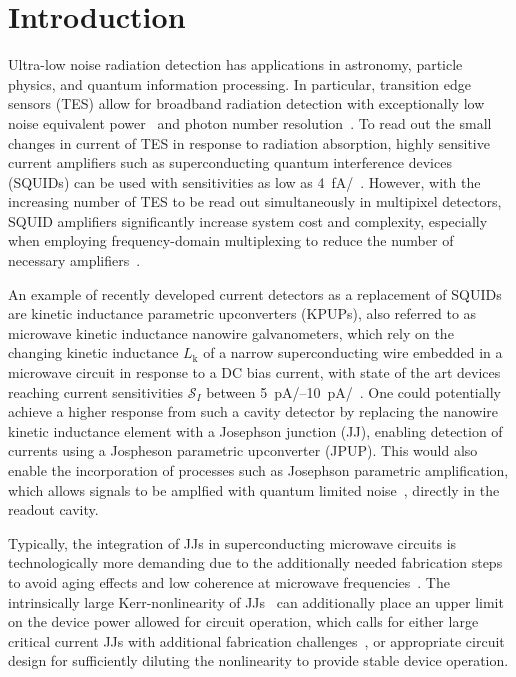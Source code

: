 \section{Introduction}

Ultra-low noise radiation detection has applications in astronomy, particle physics, and quantum information processing.
% 
In particular, transition edge sensors (TES) allow for broadband radiation detection with exceptionally low noise equivalent power~\cite{goldieUltralownoiseMoCuTransition2011} and photon number resolution~\cite{cabreraDetectionSingleInfrared1998,millerDemonstrationLownoiseNearinfrared2003}.
% 
To read out the small changes in current of TES in response to radiation absorption, highly sensitive current amplifiers such as superconducting quantum interference devices (SQUIDs) can be used with sensitivities as low as \SI{4}{\femto\ampere/\sqrthz}~\cite{gayUltralowNoiseCurrent2000}.
% 
However, with the increasing number of TES to be read out simultaneously in multipixel detectors, SQUID amplifiers significantly increase system cost and complexity, especially when employing frequency-domain multiplexing to reduce the number of necessary amplifiers~\cite{hendersonReadoutTwokilopixelTransitionedge2016}.

An example of recently developed current detectors as a replacement of SQUIDs are kinetic inductance parametric upconverters (KPUPs), also referred to as microwave kinetic inductance nanowire galvanometers, which rely on the changing kinetic inductance $L_\text{k}$ of a narrow superconducting wire embedded in a microwave circuit in response to a DC bias current, with state of the art devices reaching current sensitivities $\mathcal{S}_I$ between \SIrange{5}{10}{\pico\ampere/\sqrthz}~\cite{kherKineticInductanceParametric2016,doernerCompactMicrowaveKinetic2018,kuzminTerahertzTransitionEdgeSensor2018}.
%
One could potentially achieve a higher response from such a cavity detector by replacing the nanowire kinetic inductance element with a Josephson junction (JJ), enabling detection of currents using a Jospheson parametric upconverter (JPUP). 
% 
This would also enable the incorporation of processes such as Josephson parametric amplification, which allows signals to be amplfied with quantum limited noise~\cite{stehlikFastChargeSensing2015}, directly in the readout cavity.

Typically, the integration of JJs in superconducting microwave circuits is technologically more demanding due to the additionally needed fabrication steps to avoid aging effects and low coherence at microwave frequencies~\cite{pavolotskyAgingAnnealinginducedVariations2011,gotetiReliabilityStudiesNb2019,gunnarssonDielectricLossesMultilayer2013,yanaiObservationEnhancedCoherence2019}.
% 
The intrinsically large Kerr-nonlinearity of JJs~\cite{wallraffStrongCouplingSingle2004e} can additionally place an upper limit on the device power allowed for circuit operation, which calls for either large critical current JJs with additional fabrication challenges~\cite{lecocqJunctionFabricationShadow2011b}, or appropriate circuit design for sufficiently diluting the nonlinearity to provide stable device operation.

